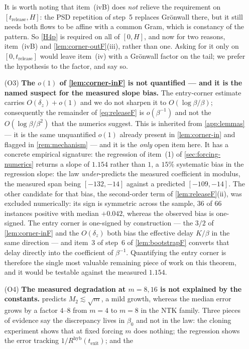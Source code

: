 \documentclass[11pt]{article}
\theoremstyle{definition}
\theoremstyle{remark}
\newcommand{\texit}{t_{\mathrm{exit}}}
\newcommand{\trel}{t_{\mathrm{release}}}
\newcommand{\hyb}{\mathrm{hyb}}
\begin{document}
\begin{enumerate}
It is worth noting that item~(ivB) does \emph{not} relieve the requirement on
$[\trel,H]$: the PSD repetition of step~5 replaces Gr\"onwall there, but it
still needs both flows to be affine with a common Gram, which is constancy of
the pattern. So \eqref{H4p} is required on all of $[0,H]$, and now for two reasons,
item~(ivB) and \cref{lem:corner-outF}(iii), rather than one. Asking for it only
on $[0,\trel]$ would leave item~(iv) with a Gr\"onwall factor on the tail; we
prefer the hypothesis to the factor, and say so.
\item[(O3)] \textbf{The $o(1)$ of \cref{lem:corner-inF} is not quantified ---
and it is the named suspect for the measured slope bias.} The entry-corner
estimate carries $O(\delta_z)+o(1)$ and we do not sharpen it to
$O(\log\beta/\beta)$; consequently the remainder of \eqref{eq:releaseF} is
$o(\beta^{-1})$ and not the $O(\log\beta/\beta^2)$ that the numerics suggest.
This is inherited from \cref{app:lemmas} --- it is the same unquantified $o(1)$
already present in \cref{lem:corner-in} and flagged in \cref{rem:mechanism} ---
and it is the \emph{only} open item here. It has a concrete empirical
signature: the regression of item~(1) of \cref{sec:forcing-numerics} returns a
slope of $1.154$ rather than $1$, a $15\%$ systematic bias in the regression
slope: the law \emph{under}-predicts the measured coefficient in modulus, the
measured span being $[-132,-14]$ against a predicted $[-109,-14]$. The other candidate for that bias, the
second-order term of \cref{lem:releaseF}(ii), was excluded numerically: its sign
is symmetric across the sample, $36$ of $66$ instances positive with median
$+0.042$, whereas the observed bias is one-signed. The entry corner is
one-signed by construction --- the $3/2$ of \cref{lem:corner-inF} and the
$O(\delta_z)$ both bias the effective delay $K/\beta$ in the same direction ---
and item~3 of step~6 of \cref{lem:bootstrapF} converts that delay directly into
the coefficient of $\beta^{-1}$. Quantifying the entry corner is therefore the
single most valuable remaining piece of work on this theorem, and it would be
testable against the measured $1.154$.
\item[(O4)] \textbf{The measured degradation at $m=8,16$ is not explained by the
constants.}  predicts $M_2\lesssim\sqrt m$, a mild growth,
whereas the median error grows by a factor $4$--$8$ from $m=4$ to $m=8$ in the
NTK family. Three pieces of evidence say the discrepancy lives in $\beta_0$ and
not in the law: the cloning experiment shows that at fixed forcing $m$ does
nothing; the regression shows the error tracking $1/R^{\hyb}(\texit)$; and the

\end{enumerate}
\end{document}

